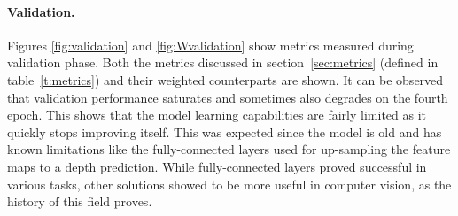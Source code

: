 \paragraph{Validation.}
Figures \ref{fig:validation} and \ref{fig:Wvalidation} show metrics measured during validation phase.
Both the metrics discussed in section~\ref{sec:metrics} (defined in table~\ref{t:metrics}) and their weighted counterparts are shown.
It can be observed that validation performance saturates and sometimes also degrades on the fourth epoch.
This shows that the model learning capabilities are fairly limited as it quickly stops improving itself.
This was expected since the model is old and has known limitations like the fully-connected layers used for up-sampling the feature maps to a depth prediction.
While fully-connected layers proved successful in various tasks, other solutions showed to be more useful in computer vision, as the history of this field proves.
